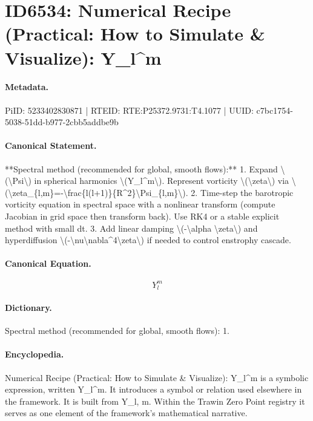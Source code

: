 \section*{ID6534: Numerical Recipe (Practical: How to Simulate \& Visualize): Y\_l\textasciicircum{}m}
\paragraph{Metadata.}
PiID: 5233402830871 | RTEID: RTE:P25372.9731:T4.1077 | UUID: c7bc1754-5038-51dd-b977-2cbb5addbe9b

\paragraph{Canonical Statement.}
**Spectral method (recommended for global, smooth flows):** 1. Expand \textbackslash{}(\textbackslash{}Psi\textbackslash{}) in spherical harmonics \textbackslash{}(Y\_l\textasciicircum{}m\textbackslash{}). Represent vorticity \textbackslash{}(\textbackslash{}zeta\textbackslash{}) via \textbackslash{}(\textbackslash{}zeta\_\{l,m\}=-\textbackslash{}frac\{l(l+1)\}\{R\textasciicircum{}2\}\textbackslash{}Psi\_\{l,m\}\textbackslash{}). 2. Time-step the barotropic vorticity equation in spectral space with a nonlinear transform (compute Jacobian in grid space then transform back). Use RK4 or a stable explicit method with small dt. 3. Add linear damping \textbackslash{}(-\textbackslash{}alpha \textbackslash{}zeta\textbackslash{}) and hyperdiffusion \textbackslash{}(-\textbackslash{}nu\textbackslash{}nabla\textasciicircum{}4\textbackslash{}zeta\textbackslash{}) if needed to control enstrophy cascade.

\paragraph{Canonical Equation.}
\[
Y_l^m
\]

\paragraph{Dictionary.}
Spectral method (recommended for global, smooth flows): 1.

\paragraph{Encyclopedia.}
Numerical Recipe (Practical: How to Simulate \& Visualize): Y\_l\textasciicircum{}m is a symbolic expression, written Y\_l\textasciicircum{}m. It introduces a symbol or relation used elsewhere in the framework. It is built from Y\_l, m. Within the Trawin Zero Point registry it serves as one element of the framework's mathematical narrative.
